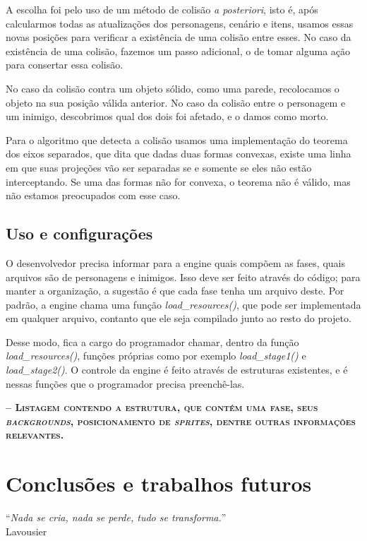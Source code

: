 \documentclass[brazil]{abnt}
\begin{document}
A escolha foi pelo uso de um método de colisão \textit{a posteriori}, isto é, após calcularmos todas as atualizações dos personagens, cenário e itens, usamos essas novas posições para verificar a existência de uma colisão entre esses. No caso da existência de uma colisão, fazemos um passo adicional, o de tomar alguma ação para consertar essa colisão.

No caso da colisão contra um objeto sólido, como uma parede, recolocamos o objeto na sua posição válida anterior. No caso da colisão entre o personagem e um inimigo, descobrimos qual dos dois foi afetado, e o damos como morto.

Para o algoritmo que detecta a colisão usamos uma implementação do teorema dos eixos separados, que dita que dadas duas formas convexas, existe uma linha em que suas projeções vão ser separadas se e somente se eles não estão interceptando. Se uma das formas não for convexa, o teorema não é válido, mas não estamos preocupados com esse caso.

\section{Uso e configurações}

O desenvolvedor precisa informar para a engine quais compõem as fases, quais arquivos são de personagens e inimigos. Isso deve ser feito através do código; para manter a organização, a sugestão é que cada fase tenha um arquivo deste. Por padrão, a engine chama uma função \textit{load\_resources()}, que pode ser implementada em qualquer arquivo, contanto que ele seja compilado junto ao resto do projeto.

Desse modo, fica a cargo do programador chamar, dentro da função \textit{load\_resources()}, funções próprias como por exemplo \textit{load\_stage1()} e \textit{load\_stage2()}. O controle da engine é feito através de estruturas existentes, e é nessas funções que o programador precisa preenchê-las.

\textsc{\textbf{-- Listagem contendo a estrutura, que contém uma fase, seus \textit{backgrounds}, posicionamento de \textit{sprites}, dentre outras informações relevantes.}}

\chapter{Conclusões e trabalhos futuros\label{cap:conclusao}}

\vfill{}
\begin{flushright}{}``\emph{Nada se cria, nada se perde, tudo se
transforma.}''\\
{\small Lavousier}\end{flushright}{\small \par}
\vfill{}
\end{document}
